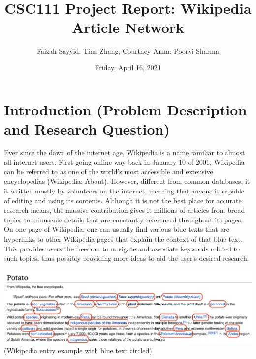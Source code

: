 \documentclass[fontsize=11pt]{article}
\title{CSC111 Project Report: Wikipedia Article Network}
\author{Faizah Sayyid, Tina Zhang, Courtney Amm, Poorvi Sharma}
\date{Friday, April 16, 2021}
\begin{document}
\maketitle


\section*{Introduction (Problem Description and Research Question)}

\qquad Ever since the dawn of the internet age, Wikipedia is a name familiar to almost all internet users. First going online way back in January 10 of 2001, Wikipedia can be referred to as one of the world's most accessible and extensive encyclopedias (Wikipedia: About). However, different from common databases, it is written mostly by volunteers on the internet, meaning that anyone is capable of editing and using its contents. Although it is not the best place for accurate research means, the massive contribution gives it millions of articles from broad topics to minuscule details that are constantly referenced throughout its pages. On one page of Wikipedia, one can usually find various blue texts that are hyperlinks to other Wikipedia pages that explain the context of that blue text. This provides users the freedom to navigate and associate keywords related to such topics, thus possibly providing more ideas to aid the user’s desired research.

\begin{center}
    \includegraphics[scale=0.5]{wiki_image.png}
    (Wikipedia entry example with blue text circled)
\end{center}
\end{document}
